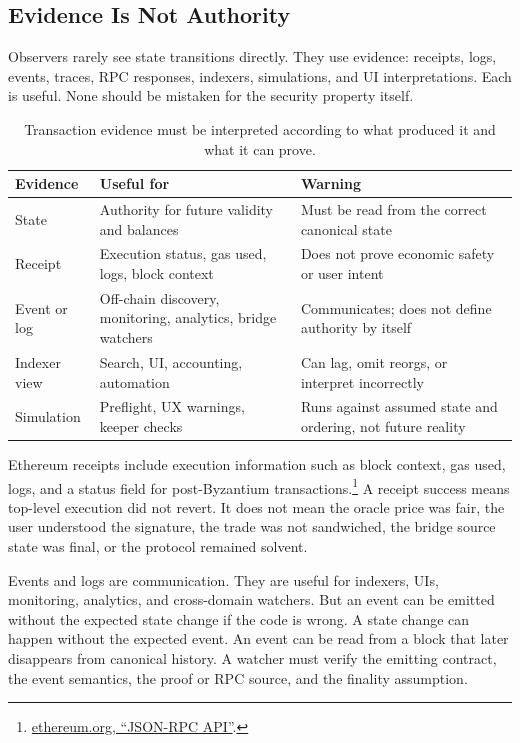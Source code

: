 \subsection{Evidence Is Not Authority}

Observers rarely see state transitions directly. They use evidence: receipts, logs, events, traces, RPC responses, indexers, simulations, and UI interpretations. Each is useful. None should be mistaken for the security property itself.

\begin{table}[htbp]
\centering
\small
\renewcommand{\arraystretch}{1.18}
\begin{tabularx}{\textwidth}{@{}>{\RaggedRight\arraybackslash}p{}>{\RaggedRight\arraybackslash}p{}X@{}}
\toprule
Evidence & Useful for & Warning \\
\midrule
State & Authority for future validity and balances & Must be read from the correct canonical state \\
Receipt & Execution status, gas used, logs, block context & Does not prove economic safety or user intent \\
Event or log & Off-chain discovery, monitoring, analytics, bridge watchers & Communicates; does not define authority by itself \\
Indexer view & Search, UI, accounting, automation & Can lag, omit reorgs, or interpret incorrectly \\
Simulation & Preflight, UX warnings, keeper checks & Runs against assumed state and ordering, not future reality \\
\bottomrule
\end{tabularx}
\caption{Transaction evidence must be interpreted according to what produced it and what it can prove.}
\end{table}

Ethereum receipts include execution information such as block context, gas used, logs, and a status field for post-Byzantium transactions.\footnote{\href{https://ethereum.org/developers/docs/apis/json-rpc/}{ethereum.org, ``JSON-RPC API''}.} A receipt success means top-level execution did not revert. It does not mean the oracle price was fair, the user understood the signature, the trade was not sandwiched, the bridge source state was final, or the protocol remained solvent.

Events and logs are communication. They are useful for indexers, UIs, monitoring, analytics, and cross-domain watchers. But an event can be emitted without the expected state change if the code is wrong. A state change can happen without the expected event. An event can be read from a block that later disappears from canonical history. A watcher must verify the emitting contract, the event semantics, the proof or RPC source, and the finality assumption.


